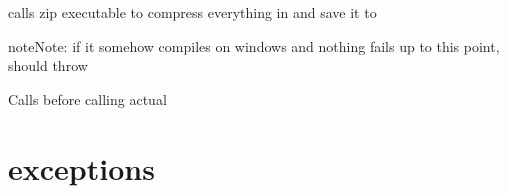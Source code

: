 \documentclass[letterpaper,10pt,english]{sphinxmanual}
\begin{document}

\begin{fulllineitems}
\label{epub:mobi2epub::directory_to_epubC}
calls zip executable to compress everything in {\hyperref[epub:path_tmp__boost::filesystem::path]{}}
and save it to {\hyperref[epub:path_out__boost::filesystem::path]{}}

\begin{notice}{note}{Note:}
if it somehow compiles on windows and nothing fails up to this point, should throw {\hyperref[exceptions:epub::terrible_operating_system_exception]{}}
\end{notice}

\end{fulllineitems}


\begin{fulllineitems}
\label{epub:mobi2epub::directory_to_epub__ss}
Calls {\hyperref[epub:mobi2epub::set_out__ssR]{}} before calling actual {\hyperref[epub:mobi2epub::directory_to_epubC]{}}

\end{fulllineitems}



\chapter{exceptions}
\label{exceptions:exceptions}\label{exceptions::doc}

\begin{fulllineitems}
\label{exceptions:mobi::not_palmdoc_compression_exception}
\end{fulllineitems}


\begin{fulllineitems}
\label{exceptions:epub::file_write_exception}
\end{fulllineitems}
\end{document}

